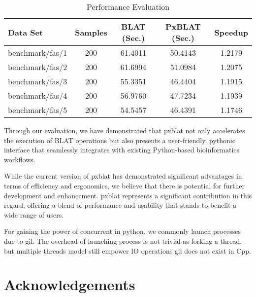 \begin{table}
	\centering
	\caption{Performance Evaluation}
	\label{tab:performance-evaluation}
	\begin{tabular}{lSSSS}
		\toprule
		Data Set        & {Samples} & {BLAT (Sec.)} & {PxBLAT (Sec.)} & {Speedup} \\
		\midrule
		benchmark/fas/1 & 200       & 61.4011       & 50.4143         & 1.2179    \\
		benchmark/fas/2 & 200       & 61.6994       & 51.0984         & 1.2075    \\
		benchmark/fas/3 & 200       & 55.3351       & 46.4404         & 1.1915    \\
		benchmark/fas/4 & 200       & 56.9760       & 47.7234         & 1.1939    \\
		benchmark/fas/5 & 200       & 54.5457       & 46.4391         & 1.1746    \\
		\bottomrule
	\end{tabular}
\end{table}


Through our evaluation, we have demonstrated that \gls{pxblat} not only accelerates the execution of BLAT operations but also presents a user-friendly,
pythonic interface that seamlessly integrates with existing Python-based bioinformatics workflows.

While the current version of \gls{pxblat}  has demonstrated significant advantages in terms of efficiency and ergonomics, we believe that there is potential for further development and enhancement.
\gls{pxblat} represents a significant contribution in this regard, offering a blend of performance and usability that stands to benefit a wide range of users.

For gaining the power of concurrent in python, we commonly launch processes due to \gls{gil}.
The overhead of launching process is not trivial as forking a thread, but multiple threads model still empower IO operations
\gls{gil} does not exist in Cpp.

\section*{Acknowledgements}\label{sec:acknowledgements}

